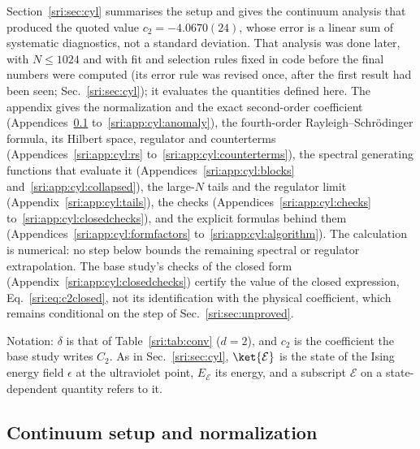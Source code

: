 Section~\ref{sri:sec:cyl} summarises the setup and gives the continuum analysis that produced the quoted value
$c_2=-4.0670(24)$, whose error is a linear sum of systematic diagnostics, not a standard deviation. That analysis was
done later, with $N\le1024$ and with fit and selection rules fixed in code before the final numbers were computed
(its error rule was revised once, after the first result had been seen; Sec.~\ref{sri:sec:cyl}); it evaluates the
quantities defined here. The appendix gives
the normalization and the exact second-order coefficient (Appendices~\ref{sri:app:cyl:setup} to~\ref{sri:app:cyl:anomaly}), the
fourth-order Rayleigh--Schr\"odinger formula, its Hilbert space, regulator and counterterms
(Appendices~\ref{sri:app:cyl:rs} to~\ref{sri:app:cyl:counterterms}), the spectral generating functions that evaluate it
(Appendices~\ref{sri:app:cyl:blocks} and~\ref{sri:app:cyl:collapsed}), the large-$N$ tails and the regulator limit
(Appendix~\ref{sri:app:cyl:tails}), the checks (Appendices~\ref{sri:app:cyl:checks} to~\ref{sri:app:cyl:closedchecks}), and the explicit
formulas behind them (Appendices~\ref{sri:app:cyl:formfactors} to~\ref{sri:app:cyl:algorithm}). The calculation is numerical: no
step below bounds the remaining spectral or regulator extrapolation. The base study's checks of the closed form
(Appendix~\ref{sri:app:cyl:closedchecks}) certify the value of the closed expression, Eq.~\eqref{sri:eq:c2closed}, not its
identification with the physical coefficient, which remains conditional on the step of Sec.~\ref{sri:sec:unproved}.

Notation: $\delta$ is that of Table~\ref{sri:tab:conv} ($d=2$), and $c_2$ is the coefficient the base study writes $C_2$.
As in Sec.~\ref{sri:sec:cyl}, $\ket{\mathcal E}$ is the state of the Ising energy field $\epsilon$ at the ultraviolet
point, $E_{\mathcal E}$ its energy, and a subscript $\mathcal E$ on a state-dependent quantity refers to it.

\subsection{Continuum setup and normalization}\label{sri:app:cyl:setup}
